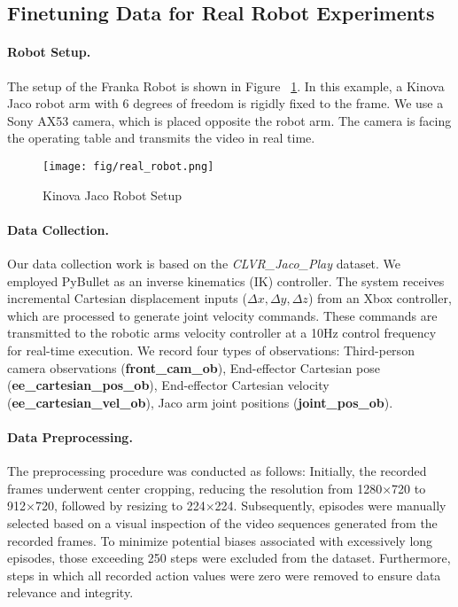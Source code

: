 \subsection{Finetuning Data for Real Robot Experiments}

\paragraph{Robot Setup.}
The setup of the Franka Robot is shown in Figure ~\ref{fig:real_robot}. In this example, a Kinova Jaco robot arm with 6 degrees of freedom is rigidly fixed to the frame. We use a Sony AX53 camera, which is placed opposite the robot arm. The camera is facing the operating table and transmits the video in real time.

\begin{figure}[h] 
    \centering
    \texttt{[image: fig/real\_robot.png]} 
    \caption{Kinova Jaco Robot Setup}
    \label{fig:real_robot}
\end{figure}

\paragraph{Data Collection.}
Our data collection work is based on the \textit{CLVR\_Jaco\_Play} dataset. We employed PyBullet as an inverse kinematics (IK) controller. The system receives incremental Cartesian displacement inputs ($\Delta x, \Delta y, \Delta z$) from an Xbox controller, which are processed to generate joint velocity commands. These commands are transmitted to the robotic arm\textquotesingle s velocity controller at a 10Hz control frequency for real-time execution. We record four types of observations: Third-person camera observations (\textbf{front\_cam\_ob}), End-effector Cartesian pose (\textbf{ee\_cartesian\_pos\_ob}), End-effector Cartesian velocity (\textbf{ee\_cartesian\_vel\_ob}), Jaco arm joint positions (\textbf{joint\_pos\_ob}).


\paragraph{Data Preprocessing. }
The preprocessing procedure was conducted as follows: Initially, the recorded frames underwent center cropping, reducing the resolution from 1280×720 to 912×720, followed by resizing to 224×224. Subsequently, episodes were manually selected based on a visual inspection of the video sequences generated from the recorded frames. To minimize potential biases associated with excessively long episodes, those exceeding 250 steps were excluded from the dataset. Furthermore, steps in which all recorded action values were zero were removed to ensure data relevance and integrity.


